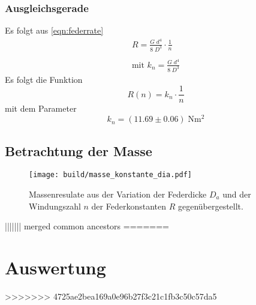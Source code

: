 \subsubsection{Ausgleichsgerade}

Es folgt aus \ref{eqn:federrate}
\begin{align*}
  R=\frac{G\;d^4}{8\;D^3}\cdot \frac{1}{n} \\\\  
  \text{mit } k_n=\frac{G\;d^4}{8\;D^3}
\end{align*}
Es folgt die Funktion
\begin{equation*}
  R(n)=k_n \cdot \frac{1}{n}
\end{equation*}
mit dem Parameter
\begin{equation*}
  k_n=(11.69 \pm 0.06) \;\si{\N\meter\squared}
\end{equation*}


\subsection{Betrachtung der Masse}
\begin{figure}[H]
  \center
  \texttt{[image: build/masse\_konstante\_dia.pdf]}
  \caption{Massenresulate aus der Variation der Federdicke $D_a$
          und der Windungszahl $n$ der Federkonstanten $R$ gegenübergestellt. }
\end{figure}



\label{sec:Auswertung}
||||||| merged common ancestors
=======
\newpage
\section{Auswertung}
\label{sec:Auswertung}
>>>>>>> 4725ae2bea169a0e96b27f3c21c1fb3c50c57da5
